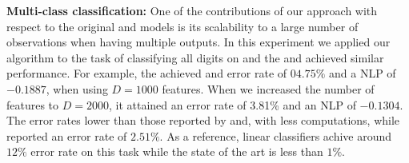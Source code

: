 \textbf{Multi-class classification:} One of the contributions of our approach with respect 
to the original \egp and \ugp models is its scalability to a large number of observations 
when having multiple outputs. In this experiment we applied our algorithm to the task
of classifying all digits on and the \eks and \uks achieved similar performance. For 
example, the \eks achieved and error rate of $ 04.75\%$ and 
a NLP of $-0.1887$, when using $D=1000$ features. When we increased the number 
of features to 	$D=2000$, it attained an error rate of 3.81\% and an NLP of $-0.1304$.
The error rates  lower than those reported by  \citet{gal-et-al-nips-2014}  and, with less 
computations, while  \citet{dezfouli-bonilla-nips-2015} reported an error 
rate of $2.51\%$. As a reference, linear classifiers achive around $12\%$ error rate on this 
task while the state of the art is less than $1\%$. 










